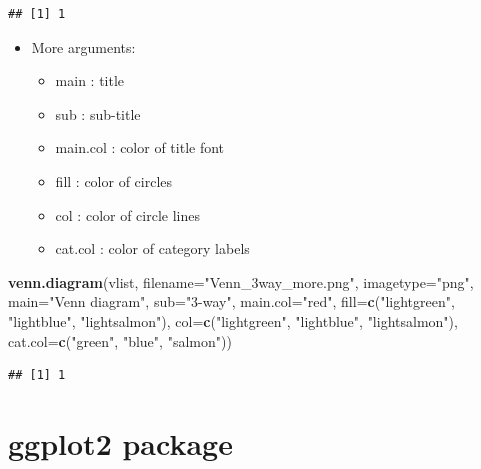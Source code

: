 \documentclass[]{book}
\newenvironment{Shaded}{\begin{snugshade}}{\end{snugshade}}
\newcommand{\DataTypeTok}[1]{\textcolor[rgb]{0.13,0.29,0.53}{#1}}
\newcommand{\KeywordTok}[1]{\textcolor[rgb]{0.13,0.29,0.53}{\textbf{#1}}}
\newcommand{\NormalTok}[1]{#1}
\newcommand{\StringTok}[1]{\textcolor[rgb]{0.31,0.60,0.02}{#1}}
\providecommand{\tightlist}{%
  \setlength{\itemsep}{0pt}\setlength{\parskip}{0pt}}
\begin{document}
\begin{verbatim}
## [1] 1
\end{verbatim}

\begin{itemize}
\tightlist
\item
  More arguments:

  \begin{itemize}
  \tightlist
  \item
    main : title
  \item
    sub : sub-title
  \item
    main.col : color of title font
  \item
    fill : color of circles
  \item
    col : color of circle lines
  \item
    cat.col : color of category labels
  \end{itemize}
\end{itemize}

\begin{Shaded}
\begin{Highlighting}[]
\KeywordTok{venn.diagram}\NormalTok{(vlist,     }
        \DataTypeTok{filename=}\StringTok{"Venn_3way_more.png"}\NormalTok{,}
        \DataTypeTok{imagetype=}\StringTok{"png"}\NormalTok{,}
    \DataTypeTok{main=}\StringTok{"Venn diagram"}\NormalTok{,}
    \DataTypeTok{sub=}\StringTok{"3-way"}\NormalTok{,}
    \DataTypeTok{main.col=}\StringTok{"red"}\NormalTok{,}
    \DataTypeTok{fill=}\KeywordTok{c}\NormalTok{(}\StringTok{"lightgreen"}\NormalTok{, }\StringTok{"lightblue"}\NormalTok{, }\StringTok{"lightsalmon"}\NormalTok{),}
    \DataTypeTok{col=}\KeywordTok{c}\NormalTok{(}\StringTok{"lightgreen"}\NormalTok{, }\StringTok{"lightblue"}\NormalTok{, }\StringTok{"lightsalmon"}\NormalTok{),}
    \DataTypeTok{cat.col=}\KeywordTok{c}\NormalTok{(}\StringTok{"green"}\NormalTok{, }\StringTok{"blue"}\NormalTok{, }\StringTok{"salmon"}\NormalTok{))}
\end{Highlighting}
\end{Shaded}

\begin{verbatim}
## [1] 1
\end{verbatim}

\hypertarget{ggplot2-package}{%
\chapter{ggplot2 package}\label{ggplot2-package}}
\end{document}
